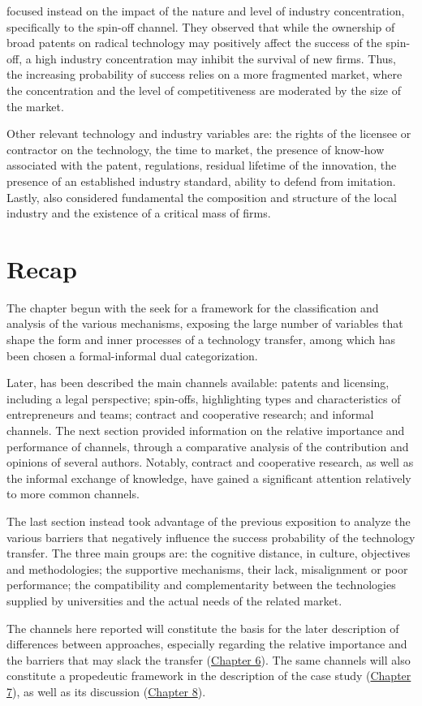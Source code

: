\citet{Nerkar2003} focused instead on the impact of the nature and level of industry concentration, specifically to the spin-off channel. They observed that while the ownership of broad patents on radical technology may positively affect the success of the spin-off, a high industry concentration may inhibit the survival of new firms. Thus, the increasing probability of success relies on a more fragmented market, where the concentration and the level of competitiveness are moderated by the size of the market. 

Other relevant technology and industry variables are: the rights of the licensee or contractor on the technology, the time to market, the presence of know-how associated with the patent, regulations, residual lifetime of the innovation, the presence of an established industry standard, ability to defend from imitation\citep{Balderi2010}. Lastly, \citet{Geuna2009} also considered fundamental the composition and structure of the local industry and the existence of a critical mass of firms.

\section{Recap}

The chapter begun with the seek for a framework for the classification and analysis of the various mechanisms, exposing the large number of variables that shape the form and inner processes of a technology transfer, among which has been chosen a formal-informal dual categorization.

Later, has been described the main channels available: patents and licensing, including a legal perspective; spin-offs, highlighting types and characteristics of entrepreneurs and teams; contract and cooperative research; and informal channels. The next section provided information on the relative importance and performance of channels, through a comparative analysis of the contribution and opinions of several authors. Notably, contract and cooperative research, as well as the informal exchange of knowledge, have gained a significant attention relatively to more common channels.

The last section instead took advantage of the previous exposition to analyze the various barriers that negatively influence the success probability of the technology transfer. The three main groups are: the cognitive distance, in culture, objectives and methodologies; the supportive mechanisms, their lack, misalignment or poor performance; the compatibility and complementarity between the technologies supplied by universities and the actual needs of the related market.

The channels here reported will constitute the basis for the later description of differences between approaches, especially regarding the relative importance and the barriers that may slack the transfer (\hyperref[Chapter6]{Chapter 6}). The same channels will also constitute a propedeutic framework in the description of the case study (\hyperref[Chapter7]{Chapter 7}), as well as its discussion (\hyperref[Chapter8]{Chapter 8}). 